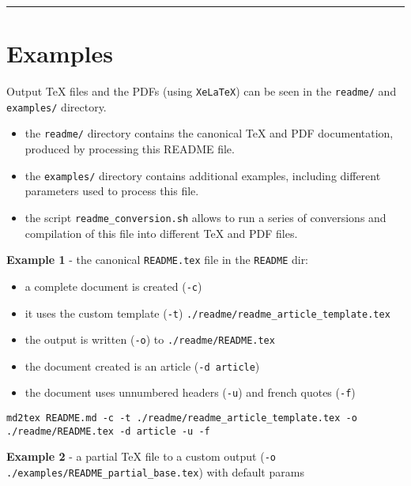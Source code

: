 \documentclass[a4paper, 12pt, twoside]{book}
\begin{document}
\par\noindent\rule{\linewidth}{0.4pt}
\section*{Examples}

Output TeX files and the PDFs (using \texttt{XeLaTeX}) can be seen in the \texttt{readme/} and \texttt{examples/} directory.

\begin{itemize}
\item the \texttt{readme/} directory contains the canonical TeX and PDF documentation, produced by processing this README file.
\item the \texttt{examples/} directory contains additional examples, including different parameters used to process this file.
\item the script \texttt{readme\_conversion.sh} allows to run a series of conversions and compilation of this file into different TeX and PDF files. 
\end{itemize}

\textbf{Example 1} - the canonical \texttt{README.tex} file in the \texttt{README} dir:

\begin{itemize}
\item a complete document is created (\texttt{-c})
\item it uses the custom template (\texttt{-t}) \texttt{./readme/readme\_article\_template.tex}
\item the output is written (\texttt{-o}) to \texttt{./readme/README.tex}
\item the document created is an article (\texttt{-d article})
\item the document uses unnumbered headers (\texttt{-u}) and french quotes (\texttt{-f}) 
\end{itemize}

\begin{listing}[h!]
   \begin{verbatim}
md2tex README.md -c -t ./readme/readme_article_template.tex -o ./readme/README.tex -d article -u -f

   \end{verbatim}
\end{listing}

\textbf{Example 2} - a partial TeX file to a custom output (\texttt{-o ./examples/README\_partial\_base.tex}) with default params
\end{document}
